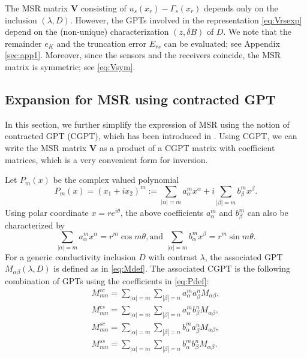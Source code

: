 The MSR matrix $\mathbf{V}$ consisting of $u_s(x_r) -
\Gamma_s(x_r)$ depends only on the inclusion $(\lambda,D)$.
However, the GPTs involved in the representation \eqref{eq:Vrsexp}
depend on the (non-unique) characterization $(z, \delta B)$ of
$D$. We note that the remainder $e_K$ and the truncation error
$E_{rs}$ can be evaluated; see Appendix \ref{sec:app1}. Moreover,
since the sensors and the receivers coincide, the MSR matrix is
symmetric; see \eqref{eq:Vsym}.

\subsection{Expansion for MSR using contracted GPT}

In this section, we further simplify the expression of MSR using
the notion of contracted GPT (CGPT), which has been introduced in
\cite{AKLL11}. Using CGPT, we can write the MSR matrix
$\mathbf{V}$ as a product of  a CGPT matrix with coefficient
matrices, which is a very convenient form for inversion.

Let $P_m(x)$ be the complex valued polynomial
\begin{equation}
P_m(x) = (x_1 + ix_2)^m := \sum_{|\alpha| = m} a^m_\alpha x^\alpha
+ i\sum_{|\beta| = m} b^m_\beta x^\beta. \label{eq:Pdef}
\end{equation}
Using polar coordinate $x = re^{i\theta}$, the above coefficients
$a^m_\alpha$ and $b^m_\beta$ can also be characterized by
\begin{equation}
\sum_{|\alpha| = m} a^m_\alpha x^\alpha = r^m \cos m\theta, \text{
and } \sum_{|\alpha| = m} b^m_\alpha x^\beta = r^m \sin m\theta.
\label{eq:abcomp}
\end{equation}
For a generic conductivity inclusion $D$ with contrast $\lambda$,
the associated GPT $M_{\alpha \beta}(\lambda, D)$ is defined as in
\eqref{eq:Mdef}. The associated CGPT is the following combination
of GPTs using the coefficients in \eqref{eq:Pdef}:
\begin{align}
M^{cc}_{mn} = \sum_{|\alpha| = m} \sum_{|\beta| = n} a^m_\alpha a^n_\beta M_{\alpha \beta}, \label{defc1}\\
M^{cs}_{mn} = \sum_{|\alpha| = m} \sum_{|\beta| = n} a^m_\alpha b^n_\beta M_{\alpha \beta},\\
M^{sc}_{mn} = \sum_{|\alpha| = m} \sum_{|\beta| = n} b^m_\alpha a^n_\beta M_{\alpha \beta},\\
M^{ss}_{mn} = \sum_{|\alpha| = m} \sum_{|\beta| = n} b^m_\alpha
b^n_\beta M_{\alpha \beta}. \label{defc2}
\end{align}


